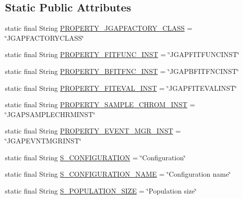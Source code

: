 \subsection*{Static Public Attributes}
\begin{DoxyCompactItemize}
\item 
static final String \hyperlink{classorg_1_1jgap_1_1_configuration_a7b5b91f069a6043a14d5ccde9fd480d7}{P\-R\-O\-P\-E\-R\-T\-Y\-\_\-\-J\-G\-A\-P\-F\-A\-C\-T\-O\-R\-Y\-\_\-\-C\-L\-A\-S\-S} = \char`\"{}J\-G\-A\-P\-F\-A\-C\-T\-O\-R\-Y\-C\-L\-A\-S\-S\char`\"{}
\item 
static final String \hyperlink{classorg_1_1jgap_1_1_configuration_aee9fd3983e9a19a0031d5361919a6890}{P\-R\-O\-P\-E\-R\-T\-Y\-\_\-\-F\-I\-T\-F\-U\-N\-C\-\_\-\-I\-N\-S\-T} = \char`\"{}J\-G\-A\-P\-F\-I\-T\-F\-U\-N\-C\-I\-N\-S\-T\char`\"{}
\item 
static final String \hyperlink{classorg_1_1jgap_1_1_configuration_aab06d33367ed969b4a4909db328f7c1c}{P\-R\-O\-P\-E\-R\-T\-Y\-\_\-\-B\-F\-I\-T\-F\-N\-C\-\_\-\-I\-N\-S\-T} = \char`\"{}J\-G\-A\-P\-B\-F\-I\-T\-F\-N\-C\-I\-N\-S\-T\char`\"{}
\item 
static final String \hyperlink{classorg_1_1jgap_1_1_configuration_a82802b737a9a40bb3ae67853cf041a4f}{P\-R\-O\-P\-E\-R\-T\-Y\-\_\-\-F\-I\-T\-E\-V\-A\-L\-\_\-\-I\-N\-S\-T} = \char`\"{}J\-G\-A\-P\-F\-I\-T\-E\-V\-A\-L\-I\-N\-S\-T\char`\"{}
\item 
static final String \hyperlink{classorg_1_1jgap_1_1_configuration_afc9eba3b76b27ad2adf5afada25020e0}{P\-R\-O\-P\-E\-R\-T\-Y\-\_\-\-S\-A\-M\-P\-L\-E\-\_\-\-C\-H\-R\-O\-M\-\_\-\-I\-N\-S\-T} = \char`\"{}J\-G\-A\-P\-S\-A\-M\-P\-L\-E\-C\-H\-R\-M\-I\-N\-S\-T\char`\"{}
\item 
static final String \hyperlink{classorg_1_1jgap_1_1_configuration_a2fd1d2a740982e62f54747bfde9d6701}{P\-R\-O\-P\-E\-R\-T\-Y\-\_\-\-E\-V\-E\-N\-T\-\_\-\-M\-G\-R\-\_\-\-I\-N\-S\-T} = \char`\"{}J\-G\-A\-P\-E\-V\-N\-T\-M\-G\-R\-I\-N\-S\-T\char`\"{}
\item 
static final String \hyperlink{classorg_1_1jgap_1_1_configuration_a5377e73a9cbfbf4828f50131b5885311}{S\-\_\-\-C\-O\-N\-F\-I\-G\-U\-R\-A\-T\-I\-O\-N} = \char`\"{}Configuration\char`\"{}
\item 
static final String \hyperlink{classorg_1_1jgap_1_1_configuration_aaa363254f293f84f3a5df787d7f58827}{S\-\_\-\-C\-O\-N\-F\-I\-G\-U\-R\-A\-T\-I\-O\-N\-\_\-\-N\-A\-M\-E} = \char`\"{}Configuration name\char`\"{}
\item 
static final String \hyperlink{classorg_1_1jgap_1_1_configuration_a92ab2a0430f9e545f56f929998734431}{S\-\_\-\-P\-O\-P\-U\-L\-A\-T\-I\-O\-N\-\_\-\-S\-I\-Z\-E} = \char`\"{}Population size\char`\"{}

\end{DoxyCompactItemize}
